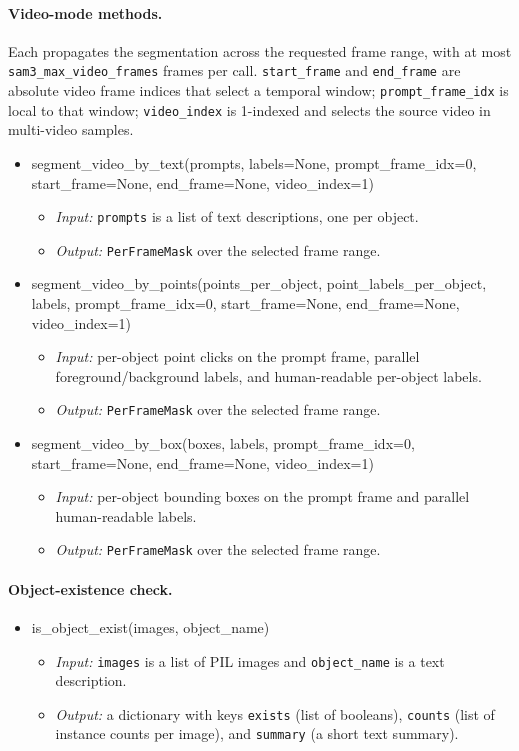 \documentclass{llmxive}
\providecommand{\apicode}[1]{#1}
\begin{document}
\paragraph{Video-mode methods.} Each propagates the segmentation across the requested frame range, with at most \texttt{sam3\_max\_video\_frames} frames per call. \texttt{start\_frame} and \texttt{end\_frame} are absolute video frame indices that select a temporal window; \texttt{prompt\_frame\_idx} is local to that window; \texttt{video\_index} is 1-indexed and selects the source video in multi-video samples.
\begin{itemize}[leftmargin=1.5em]
\item \apicode{segment_video_by_text(prompts, labels=None, prompt_frame_idx=0, start_frame=None, end_frame=None, video_index=1)}
  \begin{itemize}
  \item \emph{Input:} \texttt{prompts} is a list of text descriptions, one per object.
  \item \emph{Output:} \texttt{PerFrameMask} over the selected frame range.
  \end{itemize}
\item \apicode{segment_video_by_points(points_per_object, point_labels_per_object, labels, prompt_frame_idx=0, start_frame=None, end_frame=None, video_index=1)}
  \begin{itemize}
  \item \emph{Input:} per-object point clicks on the prompt frame, parallel foreground/background labels, and human-readable per-object labels.
  \item \emph{Output:} \texttt{PerFrameMask} over the selected frame range.
  \end{itemize}
\item \apicode{segment_video_by_box(boxes, labels, prompt_frame_idx=0, start_frame=None, end_frame=None, video_index=1)}
  \begin{itemize}
  \item \emph{Input:} per-object bounding boxes on the prompt frame and parallel human-readable labels.
  \item \emph{Output:} \texttt{PerFrameMask} over the selected frame range.
  \end{itemize}
\end{itemize}

\paragraph{Object-existence check.}
\begin{itemize}[leftmargin=1.5em]
\item \apicode{is_object_exist(images, object_name)}
  \begin{itemize}
  \item \emph{Input:} \texttt{images} is a list of PIL images and \texttt{object\_name} is a text description.
  \item \emph{Output:} a dictionary with keys \texttt{exists} (list of booleans), \texttt{counts} (list of instance counts per image), and \texttt{summary} (a short text summary).
  \end{itemize}
\end{itemize}
\end{document}
